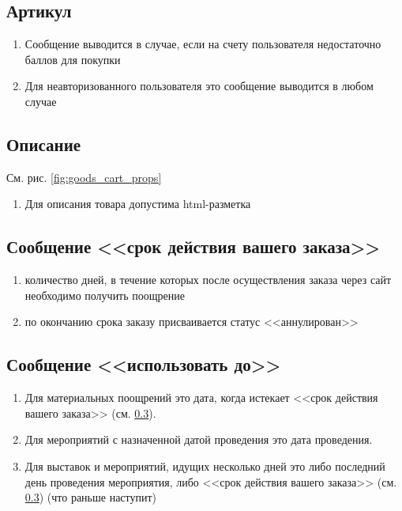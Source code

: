             
        \subsection{Артикул}
            \begin{enumerate}
                \item Сообщение выводится в случае, если на счету пользователя недостаточно баллов для покупки 
                \item Для неавторизованного пользователя это сообщение выводится в любом случае
            \end{enumerate}

        \subsection{Описание}
            См. рис. \ref{fig:goods_cart_props}
            \begin{enumerate}
                \item Для описания товара допустима html-разметка
            \end{enumerate}

        \subsection{Сообщение <<срок действия вашего заказа>>}
            \label{sec:goods_expires}
            \begin{enumerate}
                \item количество дней, в течение которых после осуществления заказа через сайт необходимо получить поощрение
                \item по окончанию срока заказу присваивается статус <<аннулирован>>
            \end{enumerate}
        
        \subsection{Сообщение <<использовать до>>}
            \begin{enumerate}
                \item Для материальных поощрений это дата, когда истекает <<срок действия вашего заказа>> (см. \ref{sec:goods_expires}).
                \item Для мероприятий с назначенной датой проведения это дата проведения.
                \item Для выставок и мероприятий, идущих несколько дней это либо последний день проведения мероприятия, 
                    либо <<срок действия вашего заказа>> (см. \ref{sec:goods_expires}) (что раньше наступит)
            \end{enumerate}
            
